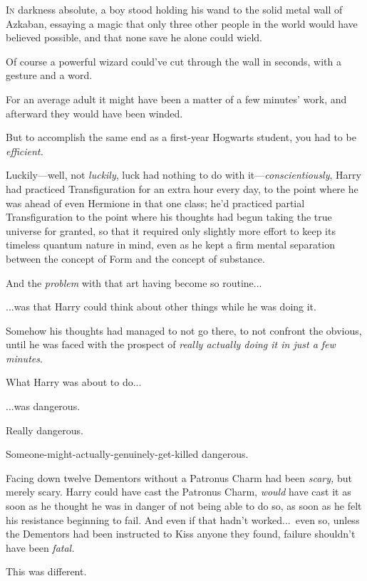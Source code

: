 \lettrine{I}{n} darkness absolute, a boy stood holding his wand to the solid metal wall of Azkaban, essaying a magic that only three other people in the world would have believed possible, and that none save he alone could wield.

Of course a powerful wizard could’ve cut through the wall in seconds, with a gesture and a word.

For an average adult it might have been a matter of a few minutes’ work, and afterward they would have been winded.

But to accomplish the same end as a first-year Hogwarts student, you had to be \emph{efficient.}

Luckily—well, not \emph{luckily}, luck had nothing to do with it—\emph{conscientiously}, Harry had practiced Transfiguration for an extra hour every day, to the point where he was ahead of even Hermione in that one class; he’d practiced partial Transfiguration to the point where his thoughts had begun taking the true universe for granted, so that it required only slightly more effort to keep its timeless quantum nature in mind, even as he kept a firm mental separation between the concept of Form and the concept of substance.

And the \emph{problem} with that art having become so routine...

...was that Harry could think about other things while he was doing it.

Somehow his thoughts had managed to not go there, to not confront the obvious, until he was faced with the prospect of \emph{really actually doing it in just a few minutes}.

What Harry was about to do...

...was dangerous.

Really dangerous.

Someone-might-actually-genuinely-get-killed dangerous.

Facing down twelve Dementors without a Patronus Charm had been \emph{scary,} but merely scary. Harry could have cast the Patronus Charm, \emph{would} have cast it as soon as he thought he was in danger of not being able to do so, as soon as he felt his resistance beginning to fail. And even if that hadn’t worked...\ even so, unless the Dementors had been instructed to Kiss anyone they found, failure shouldn’t have been \emph{fatal.}

This was different.

